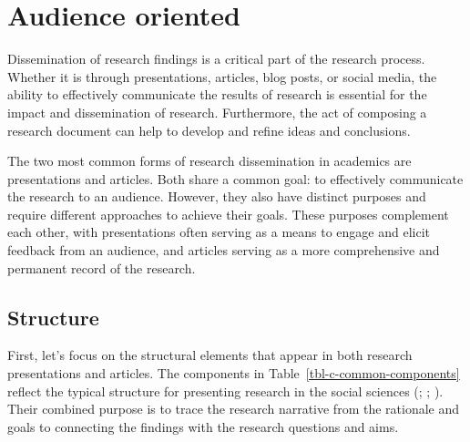 \documentclass[
  letterpaper,
]{latex/krantz}
\theoremstyle{definition}
\theoremstyle{remark}
\begin{document}
\section{Audience oriented}\label{sec-contr-audience-oriented}

Dissemination of research findings is a critical part of the research
process. Whether it is through presentations, articles, blog posts, or
social media, the ability to effectively communicate the results of
research is essential for the impact and dissemination of research.
Furthermore, the act of composing a research document can help to
develop and refine ideas and conclusions.

The two most common forms of research dissemination in academics are
presentations and articles. Both share a common goal: to effectively
communicate the research to an audience. However, they also have
distinct purposes and require different approaches to achieve their
goals. These purposes complement each other, with presentations often
serving as a means to engage and elicit feedback from an audience, and
articles serving as a more comprehensive and permanent record of the
research.

\subsection{Structure}\label{sec-contr-ao-structure}

First, let's focus on the structural elements that appear in both
research presentations and articles. The components in
Table~\ref{tbl-c-common-components} reflect the typical structure for
presenting research in the social sciences (; ;
). Their
combined purpose is to trace the research narrative from the rationale
and goals to connecting the findings with the research questions and
aims.
\end{document}
